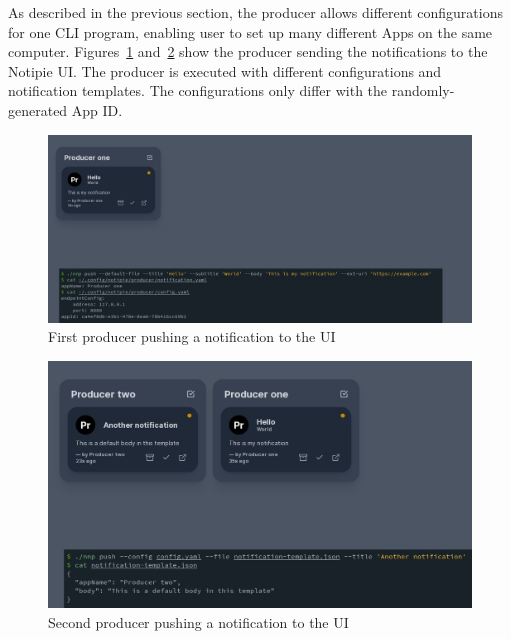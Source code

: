 As described in the previous section,
the producer allows different configurations
for one CLI program,
enabling user to set up many different Apps
on the same computer.
Figures~\ref{fig:notipie-one-notification}
and~\ref{fig:notipie-two-notifications}
show the producer sending the notifications
to the Notipie UI.
The producer is executed
with different configurations
and notification templates.
The configurations only differ
with the randomly-generated App ID.

\begin{figure}[p]
  \centering
  \includegraphics[width=\linewidth,keepaspectratio]{img/notipie_one_notification.jpg}
  \caption{First producer pushing a notification to the UI}
  \label{fig:notipie-one-notification}
\end{figure}

\begin{figure}[p]
  \centering
  \includegraphics[width=\linewidth,keepaspectratio]{img/notipie_two_notifications.jpg}
  \caption{Second producer pushing a notification to the UI}
  \label{fig:notipie-two-notifications}
\end{figure}
